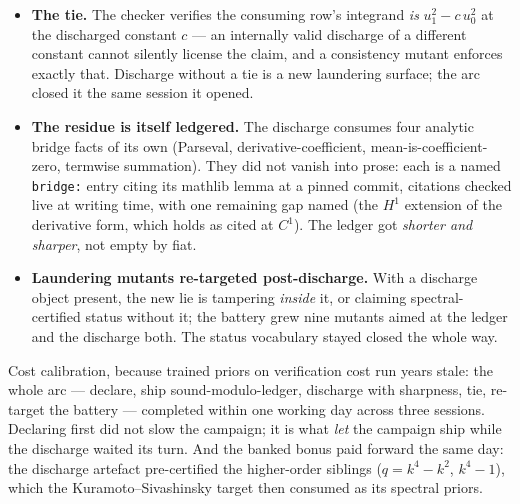 \begin{itemize}
\item \textbf{The tie.} The checker verifies the consuming row's
  integrand \emph{is} $u_1^2 - c\,u_0^2$ at the discharged constant $c$
  --- an internally valid discharge of a different constant cannot
  silently license the claim, and a consistency mutant enforces
  exactly that. Discharge without a tie is a new laundering surface;
  the arc closed it the same session it opened.
\item \textbf{The residue is itself ledgered.} The discharge consumes
  four analytic bridge facts of its own (Parseval,
  derivative-coefficient, mean-is-coefficient-zero, termwise
  summation). They did not vanish into prose: each is a named
  \texttt{bridge:} entry citing its mathlib lemma at a pinned commit,
  citations checked live at writing time, with one remaining gap named
  (the $H^1$ extension of the derivative form, which holds as cited at
  $C^1$). The ledger got \emph{shorter and sharper}, not empty by
  fiat.
\item \textbf{Laundering mutants re-targeted post-discharge.} With a
  discharge object present, the new lie is tampering \emph{inside} it,
  or claiming spectral-certified status without it; the battery grew
  nine mutants aimed at the ledger and the discharge both. The status
  vocabulary stayed closed the whole way.
\end{itemize}

Cost calibration, because trained priors on verification cost run
years stale: the whole arc --- declare, ship sound-modulo-ledger,
discharge with sharpness, tie, re-target the battery --- completed
within one working day across three sessions. Declaring first did not
slow the campaign; it is what \emph{let} the campaign ship while the
discharge waited its turn. And the banked bonus paid forward the same
day: the discharge artefact pre-certified the higher-order siblings
($q = k^4 - k^2$, $k^4 - 1$), which the Kuramoto--Sivashinsky target
then consumed as its spectral priors.

